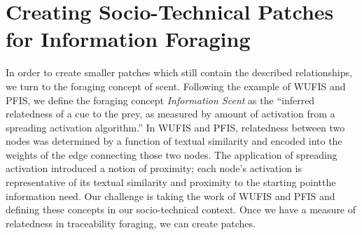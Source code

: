 \documentclass[conference]{IEEEtran}
\begin{document}
\section{Creating Socio-Technical Patches for Information Foraging}
In order to create smaller patches which still contain the described relationships, we turn to the foraging concept of scent. Following the example of WUFIS and PFIS,
we define the foraging concept \textit{Information Scent} as the ``inferred relatedness of a cue to the prey, as measured by amount of activation from a spreading activation algorithm.'' In WUFIS and PFIS, relatedness between two nodes was determined by a function of textual similarity and encoded into the weights of the edge connecting those two nodes. The application of spreading activation introduced a notion of proximity; each node's activation is representative of its textual similarity and proximity to the starting point\textemdash the information need. Our challenge is taking the work of WUFIS and PFIS and defining these concepts in our socio-technical context. Once we have a measure of relatedness in traceability foraging, we can create patches.
\end{document}
